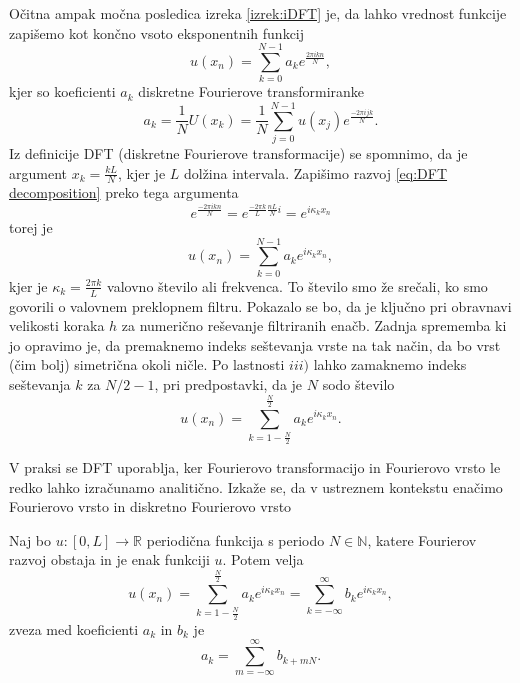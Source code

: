 \documentclass[mat2, tisk]{fmfdelo}
\newcommand{\R}{\mathbb R}
\newcommand{\N}{\mathbb N}
\begin{document}
Očitna ampak močna posledica izreka \ref{izrek:iDFT} je, da lahko 
vrednost funkcije zapišemo kot končno vsoto eksponentnih funkcij 
\begin{equation}
  \label{eq:DFT decomposition}
u(x_n) = \sum_{k=0}^{N-1} a_k e^{\frac{2\pi i k n}{N}},
\end{equation}
kjer so koeficienti $a_k$ diskretne Fourierove transformiranke 
\begin{equation}
a_k = \frac{1}{N} U(x_k) = \frac{1}{N} \sum_{j=0}^{N-1} u(x_j) e^{\frac{-2\pi i j k}{N}}.
\end{equation}
Iz definicije DFT (diskretne Fourierove transformacije) se spomnimo, da je 
argument $x_k = \frac{k L}{N}$, kjer je $L$ dolžina intervala. Zapišimo 
razvoj \ref{eq:DFT decomposition} preko tega argumenta 
$$
e^{\frac{-2\pi i k n}{N}} = e^{\frac{-2\pi k}{L}\frac{nL}{N}i} = e^{i\kappa_k x_n}
$$
torej je 
\begin{equation}
u(x_n) = \sum_{k=0}^{N-1} a_k e^{i\kappa_k x_n},
\end{equation}
kjer je $\kappa_k = \frac{2\pi k}{L}$ valovno število ali frekvenca.
To število smo že srečali, ko smo govorili o valovnem preklopnem 
filtru. Pokazalo se bo, da je ključno pri obravnavi velikosti koraka $h$ 
za numerično reševanje filtriranih enačb. Zadnja sprememba ki 
jo opravimo je, da premaknemo indeks seštevanja vrste na tak način, da bo vrst (čim bolj) simetrična okoli ničle. 
Po lastnosti $iii)$ lahko zamaknemo indeks seštevanja $k$ za $N/2 - 1$, pri 
predpostavki, da je $N$ sodo število
\begin{equation}
  \label{eq:DFS expantion}
u(x_n) = \sum_{k=1-\frac{N}{2}}^{\frac{N}{2}} a_k e^{i\kappa_k x_n}.
\end{equation} 

V praksi se DFT uporablja, ker Fourierovo transformacijo in 
Fourierovo vrsto le redko lahko izračunamo analitično.
Izkaže se, da v ustreznem kontekstu enačimo Fourierovo vrsto in diskretno Fourierovo vrsto
\begin{izrek}
Naj bo $u: [0, L] \rightarrow \R$ periodična funkcija s periodo $N\in \N$, katere Fourierov 
razvoj obstaja in je enak funkciji $u$. Potem velja
\begin{equation}
u(x_n) = \sum_{k=1-\frac{N}{2}}^{\frac{N}{2}} a_k e^{i\kappa_k x_n} =
\sum_{k=-\infty}^{\infty} b_k e^{i\kappa_k x_n},
\end{equation}
zveza med koeficienti $a_k$ in $b_k$ je
\begin{equation}
  a_k = \sum_{m=-\infty}^{\infty} b_{k + mN}. 
\end{equation}
\end{izrek}
\end{document}
